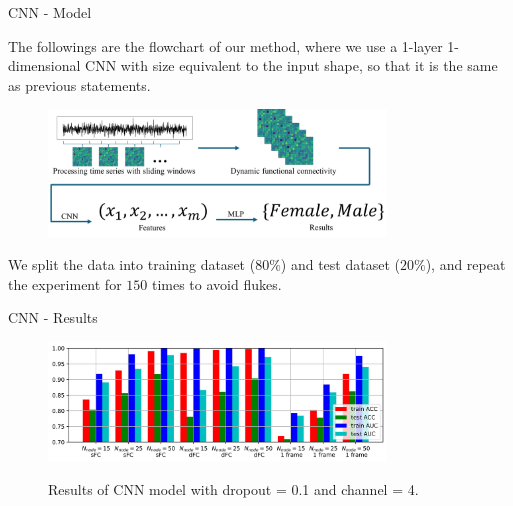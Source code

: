 \documentclass{beamer}
\begin{document}
\begin{frame}{CNN - Model}

    The followings are the flowchart of our method, where we use a 1-layer 1-dimensional CNN with size equivalent to the input shape, so that it is the same as previous statements.

    \begin{figure}[H]
        \centering
        \includegraphics[width=0.8\textwidth]{./figure/method.png}
    \end{figure}

    We split the data into training dataset ($80\%$) and test dataset ($20\%$), and repeat the experiment for $150$ times to avoid flukes.

\end{frame}

\begin{frame}{CNN - Results}

    \begin{figure}[H]
        \centering
        \includegraphics[width=0.8\textwidth]{../Result/bar_channel=4_dropout=0.1.jpg} \\
        \caption{Results of CNN model with dropout = 0.1 and channel = 4.}
    \end{figure}

\end{frame}
\end{document}
